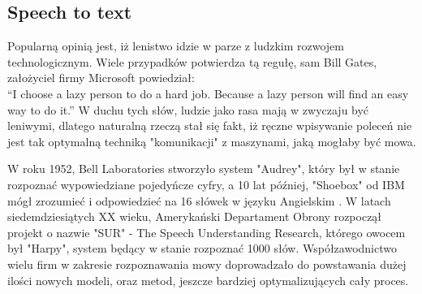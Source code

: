 \documentclass[12pt, a4paper]{article}
\begin{document}
\begin{sloppypar}
{  \subsection{Speech to text}
  {
    Popularną opinią jest, iż lenistwo idzie w parze z ludzkim rozwojem 
    technologicznym. Wiele przypadków potwierdza tą regułę, sam Bill Gates, założyciel
    firmy Microsoft powiedział:\\ 
    “I choose a lazy person to do a hard job. 
    Because a lazy person will find an easy way to do it.”
    W duchu tych słów, ludzie jako rasa mają w zwyczaju być leniwymi, dlatego
    naturalną rzeczą stał się fakt, iż ręczne wpisywanie poleceń nie jest tak 
    optymalną techniką "komunikacji" z maszynami, jaką mogłaby być mowa.
    
    W roku 1952, Bell Laboratories stworzyło system "Audrey", który był w stanie 
    rozpoznać wypowiedziane pojedyńcze cyfry, a 10 lat później, "Shoebox" od IBM
    mógł zrozumieć i odpowiedzieć na 16 słówek w języku Angielskim \cite{speech_history}.
    W latach siedemdziesiątych XX wieku, Amerykański Departament Obrony rozpoczął
    projekt o nazwie "SUR" - The Speech Understanding Research, którego owocem
    był "Harpy", system będący w stanie rozpoznać 1000 słów. Współzawodnictwo wielu
    firm w zakresie rozpoznawania mowy doprowadzało do powstawania dużej ilości nowych
    modeli, oraz metod, jeszcze bardziej optymalizujących cały proces.

}}
\end{sloppypar}
\end{document}
